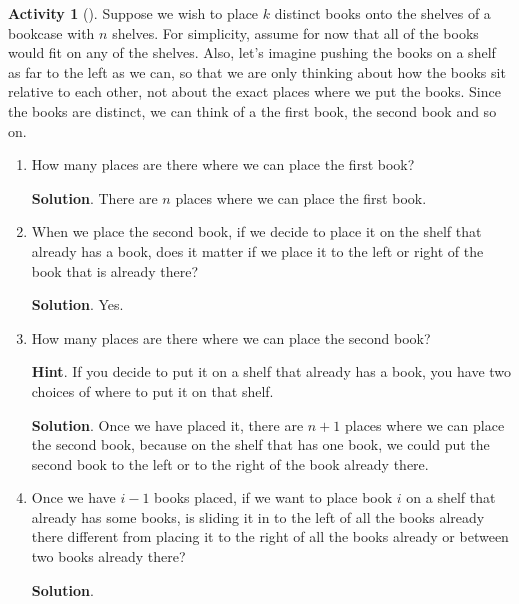 \documentclass[10pt,]{book}
\theoremstyle{plain}
\theoremstyle{definition}
\theoremstyle{definition}
\theoremstyle{definition}
\newtheorem{activity}[project]{Activity}
\theoremstyle{definition}
\numberwithin{equation}{chapter}
\begin{document}
\begin{activity}[]\label{bookcase}
\hypertarget{p-730}{}%
Suppose we wish to place \(k\) distinct books onto the shelves of a bookcase with \(n\) shelves. For simplicity, assume for now that all of the books would fit on any of the shelves. Also, let's imagine pushing the books on a shelf as far to the left as we can, so that we are only thinking about how the books sit relative to each other, not about the exact places where we put the books. Since the books are distinct, we can think of a the first book, the second book and so on.%
\begin{enumerate}[font=\bfseries,label=(\alph*),ref=\alph*]
\item\label{task-92} \hypertarget{p-731}{}%
How many places are there where we can place the first book?%
\par\smallskip%
\noindent\textbf{Solution}.\hypertarget{solution-64}{}\quad%
\hypertarget{p-732}{}%
There are \(n\) places where we can place the first book.%
\item\label{task-93} \hypertarget{p-733}{}%
When we place the second book, if we decide to place it on the shelf that already has a book, does it matter if we place it to the left or right of the book that is already there?%
\par\smallskip%
\noindent\textbf{Solution}.\hypertarget{solution-65}{}\quad%
\hypertarget{p-734}{}%
Yes.%
\item\label{task-94} \hypertarget{p-735}{}%
How many places are there where we can place the second book?%
\par\smallskip%
\noindent\textbf{Hint}.\hypertarget{hint-57}{}\quad%
\hypertarget{p-736}{}%
If you decide to put it on a shelf that already has a book, you have two choices of where to put it on that shelf.%
\par\smallskip%
\noindent\textbf{Solution}.\hypertarget{solution-66}{}\quad%
\hypertarget{p-737}{}%
Once we have placed it, there are \(n+1\) places where we can place the second book, because on the shelf that has one book, we could put the second book to the left or to the right of the book already there.%
\item\label{task-95} \hypertarget{p-738}{}%
Once we have \(i-1\) books placed, if we want to place book \(i\)  on a shelf that already has some books, is sliding it in to the left of all the books already there different from placing it to the right of all the books already or between two books already there?%
\par\smallskip%
\noindent\textbf{Solution}.\hypertarget{solution-67}{}\quad%

\end{enumerate}
\end{activity}
\end{document}
